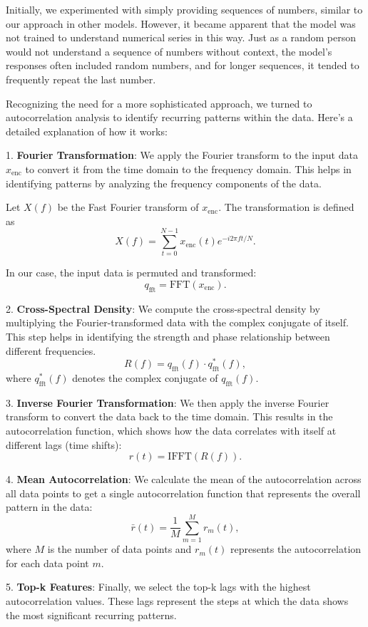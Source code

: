 Initially, we experimented with simply providing sequences of numbers, similar to our approach in other models. However, it became apparent that the model was not trained to understand numerical series in this way. Just as a random person would not understand a sequence of numbers without context, the model's responses often included random numbers, and for longer sequences, it tended to frequently repeat the last number.

Recognizing the need for a more sophisticated approach, we turned to autocorrelation analysis to identify recurring patterns within the data. Here’s a detailed explanation of how it works:

1. \textbf{Fourier Transformation}: We apply the Fourier transform to the input data \( x_{\text{enc}} \) to convert it from the time domain to the frequency domain. This helps in identifying patterns by analyzing the frequency components of the data.

Let \( X(f) \) be the Fast Fourier transform of \( x_{\text{enc}} \). The transformation is defined as
\[
	X(f) = \sum_{t=0}^{N-1} x_{\text{enc}}(t) e^{-i 2 \pi f t / N}.
\]

In our case, the input data is permuted and transformed:
\[
	q_{\text{fft}} = \text{FFT}(x_{\text{enc}}).
\]

2. \textbf{Cross-Spectral Density}: We compute the cross-spectral density by multiplying the Fourier-transformed data with the complex conjugate of itself. This step helps in identifying the strength and phase relationship between different frequencies.
\[
	R(f) = q_{\text{fft}}(f) \cdot q_{\text{fft}}^*(f),
\]
where \( q_{\text{fft}}^*(f) \) denotes the complex conjugate of \( q_{\text{fft}}(f) \).

3. \textbf{Inverse Fourier Transformation}: We then apply the inverse Fourier transform to convert the data back to the time domain. This results in the autocorrelation function, which shows how the data correlates with itself at different lags (time shifts):
\[
	r(t) = \text{IFFT}(R(f)).
\]

4. \textbf{Mean Autocorrelation}: We calculate the mean of the autocorrelation across all data points to get a single autocorrelation function that represents the overall pattern in the data:
\[
	\bar{r}(t) = \frac{1}{M} \sum_{m=1}^{M} r_m(t),
\]
where \( M \) is the number of data points and \( r_m(t) \) represents the autocorrelation for each data point \( m \).

5. \textbf{Top-k Features}: Finally, we select the top-k lags with the highest autocorrelation values. These lags represent the steps at which the data shows the most significant recurring patterns.

